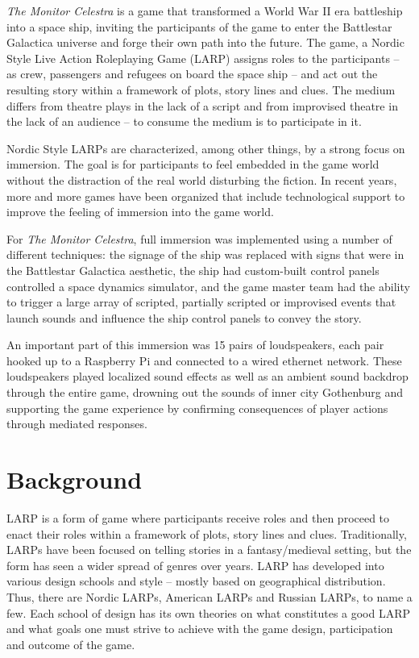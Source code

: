 \emph{The Monitor Celestra} is a game that transformed a World War II era battleship into a space ship, inviting the participants of the game to enter the Battlestar Galactica\cite{larson_battlestar_1978} universe and forge their own path into the future. The game, a Nordic Style Live Action Roleplaying Game (LARP) assigns roles to the participants -- as crew, passengers and refugees on board the space ship -- and act out the resulting story within a framework of plots, story lines and clues. The medium differs from theatre plays in the lack of a script and from improvised theatre in the lack of an audience -- to consume the medium is to participate in it.

Nordic Style LARPs are characterized, among other things, by a strong focus on immersion. The goal is for participants to feel embedded in the game world without the distraction of the real world disturbing the fiction. In recent years, more and more games have been organized that include technological support to improve the feeling of immersion into the game world.

For \emph{The Monitor Celestra}, full immersion was implemented using a number of different techniques: the signage of the ship was replaced with signs that were
in the Battlestar Galactica aesthetic, the ship
had custom-built control panels controlled a space dynamics simulator, and the game
master team had the ability to trigger a large array of scripted, partially scripted or improvised events that launch sounds and influence the ship control panels to convey the story.

An important part of this immersion was 15 pairs of
loudspeakers, each pair hooked up to a Raspberry Pi\cite{rpi} and
connected to a wired ethernet network. These loudspeakers played
localized sound effects as well as an ambient sound backdrop through
the entire game, drowning out the sounds of inner city Gothenburg and
supporting the game experience by confirming consequences of player
actions through mediated responses.

\section{Background}
\label{sec:background}

LARP is a form of game where participants receive roles and then proceed to enact their roles within a framework of plots, story lines and clues. Traditionally, LARPs have been focused on telling stories in a fantasy/medieval setting, but the form has seen a wider spread of genres over years. LARP has developed into various design schools and style -- mostly based on geographical distribution. Thus, there are Nordic LARPs, American LARPs and Russian LARPs, to name a few\cite{kp2011}. Each school of design has its own theories on what constitutes a good LARP and what goals one must strive to achieve with the game design, participation and outcome of the game.

